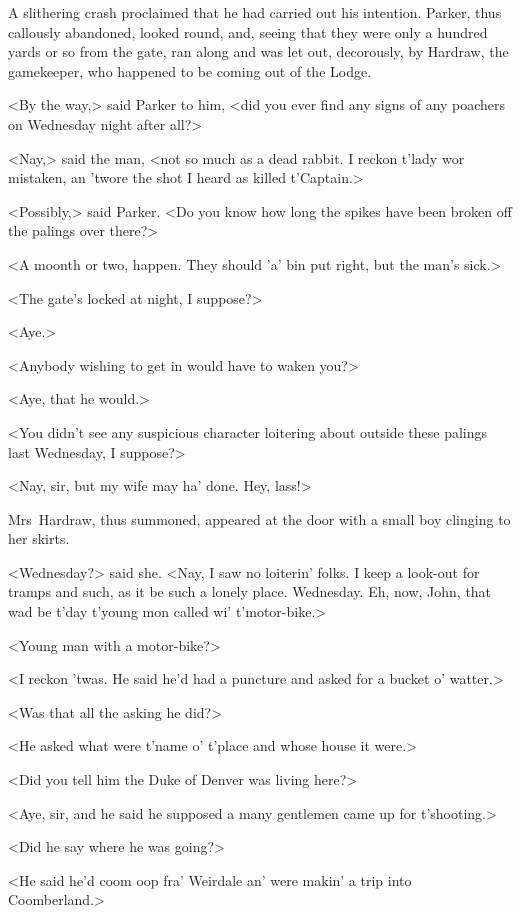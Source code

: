 A slithering crash proclaimed that he had carried out his intention.  Parker, thus callously abandoned, looked round, and, seeing that they were only a hundred yards or so from the gate, ran along and was let out, decorously, by Hardraw, the gamekeeper, who happened to be coming out of the Lodge.

<By the way,> said Parker to him, <did you ever find any signs of any poachers on Wednesday night after all?>

<Nay,> said the man, <not so much as a dead rabbit. I reckon t'lady wor mistaken, an 'twore the shot I heard as killed t'Captain.>

<Possibly,> said Parker. <Do you know how long the spikes have been broken off the palings over there?>

<A moonth or two, happen. They should 'a' bin put right, but the man's sick.>

<The gate's locked at night, I suppose?>

<Aye.>

<Anybody wishing to get in would have to waken you?>

<Aye, that he would.>

<You didn't see any suspicious character loitering about outside these palings last Wednesday, I suppose?>

<Nay, sir, but my wife may ha' done. Hey, lass!>

Mrs~Hardraw, thus summoned, appeared at the door with a small boy clinging to her skirts.

<Wednesday?> said she. <Nay, I saw no loiterin' folks. I keep a look-out for tramps and such, as it be such a lonely place. Wednesday.  Eh, now, John, that wad be t'day t'young mon called wi' t'motor-bike.>

<Young man with a motor-bike?>

<I reckon 'twas. He said he'd had a puncture and asked for a bucket o' watter.>

<Was that all the asking he did?>

<He asked what were t'name o' t'place and whose house it were.>

<Did you tell him the Duke of Denver was living here?>

<Aye, sir, and he said he supposed a many gentlemen came up for t'shooting.>

<Did he say where he was going?>

<He said he'd coom oop fra' Weirdale an' were makin' a trip into Coomberland.>

